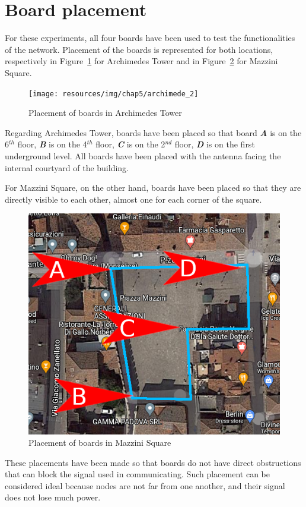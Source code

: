 	\section{Board placement}
	
		For these experiments, all four boards have been used to test the functionalities of the network.
		Placement of the boards is represented for both locations, respectively in Figure~\ref{img:archimede_2} for Archimedes Tower and in Figure~\ref{img:pzza_mazzini_2} for Mazzini Square.
		
		\begin{figure}[h]
			\centering
			\texttt{[image: resources/img/chap5/archimede\_2]}
			\caption{Placement of boards in Archimedes Tower}
			\label{img:archimede_2}
		\end{figure}
	
		Regarding Archimedes Tower, boards have been placed so that board \textbf{\textit{A}} is on the 6$^{th}$ floor, \textbf{\textit{B}} is on the 4$^{th}$ floor, \textbf{\textit{C}} is on the 2$^{nd}$ floor, \textbf{\textit{D}} is on the first underground level.
		All boards have been placed with the antenna facing the internal courtyard of the building.
		
		For Mazzini Square, on the other hand, boards have been placed so that they are directly visible to each other, almost one for each corner of the square.
		
		\begin{figure}[h]
			\centering
			\includegraphics[width=.6\textwidth]{resources/img/chap5/pzza_mazzini_3}
			\caption{Placement of boards in Mazzini Square}
			\label{img:pzza_mazzini_2}
		\end{figure}
	
		These placements have been made so that boards do not have direct obstructions that can block the signal used in communicating.
		Such placement can be considered ideal because nodes are not far from one another, and their signal does not lose much power.

